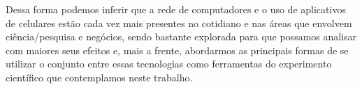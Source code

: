 Dessa forma podemos inferir que a rede de computadores e o uso de aplicativos de celulares estão cada vez mais presentes no cotidiano e nas áreas que envolvem ciência/pesquisa e negócios, sendo bastante explorada para que possamos analisar com maiores seus efeitos e, mais a frente, abordarmos as principais formas de se utilizar o conjunto entre essas tecnologias como ferramentas do experimento científico que contemplamos neste trabalho.

   

